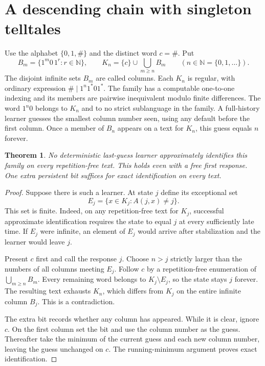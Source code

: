\documentclass[11pt]{article}
\newtheorem{theorem}{Theorem}
\newcommand{\N}{\mathbb N}
\begin{document}
\section{A descending chain with singleton telltales}
Use the alphabet $\{0,1,\#\}$ and the distinct word $c=\#$. Put
\[
 B_m=\{1^m0\,1^r:r\in\N\},\qquad
 K_n=\{c\}\cup\bigcup_{m\ge n}B_m \qquad(n\in\N=\{0,1,\ldots\}).
\]
The disjoint infinite sets $B_m$ are called columns. Each $K_n$ is regular, with ordinary expression $\#\mid 1^n1^*01^*$. The family has a computable one-to-one indexing and its members are pairwise inequivalent modulo finite differences. The word $1^n0$ belongs to $K_n$ and to no strict sublanguage in the family. A full-history learner guesses the smallest column number seen, using any default before the first column. Once a member of $B_n$ appears on a text for $K_n$, this guess equals $n$ forever.

\begin{theorem}\label{main}
No deterministic last-guess learner approximately identifies this family on every repetition-free text. This holds even with a free first response. One extra persistent bit suffices for exact identification on every text.
\end{theorem}
\begin{proof}
Suppose there is such a learner. At state $j$ define its exceptional set
\[
    E_j=\{x\in K_j:A(j,x)\ne j\}.
\]
This set is finite. Indeed, on any repetition-free text for $K_j$, successful approximate identification requires the state to equal $j$ at every sufficiently late time. If $E_j$ were infinite, an element of $E_j$ would arrive after stabilization and the learner would leave $j$.

Present $c$ first and call the response $j$. Choose $n>j$ strictly larger than the numbers of all columns meeting $E_j$. Follow $c$ by a repetition-free enumeration of $\bigcup_{m\ge n}B_m$. Every remaining word belongs to $K_j\setminus E_j$, so the state stays $j$ forever. The resulting text exhausts $K_n$, which differs from $K_j$ on the entire infinite column $B_j$. This is a contradiction.

The extra bit records whether any column has appeared. While it is clear, ignore $c$. On the first column set the bit and use the column number as the guess. Thereafter take the minimum of the current guess and each new column number, leaving the guess unchanged on $c$. The running-minimum argument proves exact identification.
\end{proof}
\end{document}
